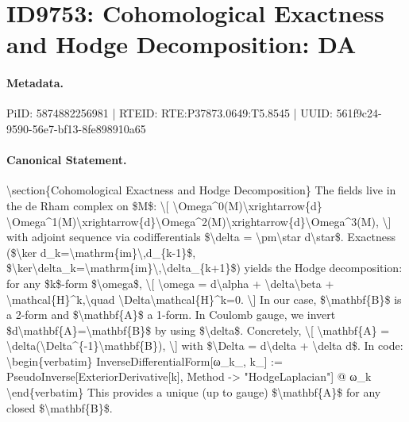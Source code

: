 \section*{ID9753: Cohomological Exactness and Hodge Decomposition: DA}
\paragraph{Metadata.}
PiID: 5874882256981 | RTEID: RTE:P37873.0649:T5.8545 | UUID: 561f9c24-9590-56e7-bf13-8fe898910a65

\paragraph{Canonical Statement.}
\textbackslash{}section\{Cohomological Exactness and Hodge Decomposition\} The fields live in the de Rham complex on \$M\$: \textbackslash{}[ \textbackslash{}Omega\textasciicircum{}0(M)\textbackslash{}xrightarrow\{d\} \textbackslash{}Omega\textasciicircum{}1(M)\textbackslash{}xrightarrow\{d\}\textbackslash{}Omega\textasciicircum{}2(M)\textbackslash{}xrightarrow\{d\}\textbackslash{}Omega\textasciicircum{}3(M), \textbackslash{}] with adjoint sequence via codifferentials \$\textbackslash{}delta = \textbackslash{}pm\textbackslash{}star d\textbackslash{}star\$. Exactness (\$\textbackslash{}ker d\_k=\textbackslash{}mathrm\{im\}\textbackslash{},d\_\{k-1\}\$, \$\textbackslash{}ker\textbackslash{}delta\_k=\textbackslash{}mathrm\{im\}\textbackslash{},\textbackslash{}delta\_\{k+1\}\$) yields the Hodge decomposition: for any \$k\$-form \$\textbackslash{}omega\$, \textbackslash{}[ \textbackslash{}omega = d\textbackslash{}alpha + \textbackslash{}delta\textbackslash{}beta + \textbackslash{}mathcal\{H\}\textasciicircum{}k,\textbackslash{}quad \textbackslash{}Delta\textbackslash{}mathcal\{H\}\textasciicircum{}k=0. \textbackslash{}] In our case, \$\textbackslash{}mathbf\{B\}\$ is a 2-form and \$\textbackslash{}mathbf\{A\}\$ a 1-form. In Coulomb gauge, we invert \$d\textbackslash{}mathbf\{A\}=\textbackslash{}mathbf\{B\}\$ by using \$\textbackslash{}delta\$. Concretely, \textbackslash{}[ \textbackslash{}mathbf\{A\} = \textbackslash{}delta(\textbackslash{}Delta\textasciicircum{}\{-1\}\textbackslash{}mathbf\{B\}), \textbackslash{}] with \$\textbackslash{}Delta = d\textbackslash{}delta + \textbackslash{}delta d\$. In code: \textbackslash{}begin\{verbatim\} InverseDifferentialForm[ω\_k\_, k\_] := PseudoInverse[ExteriorDerivative[k], Method -> "HodgeLaplacian"] @ ω\_k \textbackslash{}end\{verbatim\} This provides a unique (up to gauge) \$\textbackslash{}mathbf\{A\}\$ for any closed \$\textbackslash{}mathbf\{B\}\$.

